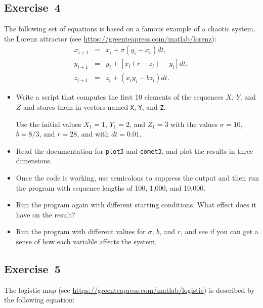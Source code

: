 \subsection{Exercise~4}
  The following set of equations is based on a famous example of a chaotic system, the Lorenz attractor (see \url{https://greenteapress.com/matlab/lorenz}):
%
\begin{eqnarray*}
x_{i+1} &=& x_i + \sigma \left( y_i - x_i \right) dt,  \\
y_{i+1} &=& y_i + \left[ x_i (r - z_i) - y_i \right] dt,   \\
z_{i+1} &=& z_i + \left( x_i y_i - b z_i \right) dt.
\end{eqnarray*}
%
\begin{itemize}

\item Write a script that computes the first 10 elements of the sequences
$X$, $Y$, and $Z$ and stores them in vectors named \lstinline{X}, \lstinline{Y},
and \lstinline{Z}.

Use the initial values $X_1 = 1$, $Y_1 = 2$, and $Z_1 = 3$ with the values
$\sigma = 10$, $b = 8/3$, and $r = 28$, and with $dt = 0.01$.

\item Read the documentation for \lstinline{plot3} and \lstinline{comet3}, and
plot the results in three dimensions.

\item Once the code is working, use semicolons to suppress the output
and then run the program with sequence lengths of 100, 1,000, and 10,000.

\item Run the program again with different starting conditions.
What effect does it have on the result?

\item Run the program with different values for $\sigma$, $b$, and $r$,
and see if you can get a sense of how each variable affects the
system.

\end{itemize}




\subsection{Exercise~5}
The logistic map (see \url{https://greenteapress.com/matlab/logistic}) is described by the following equation:

